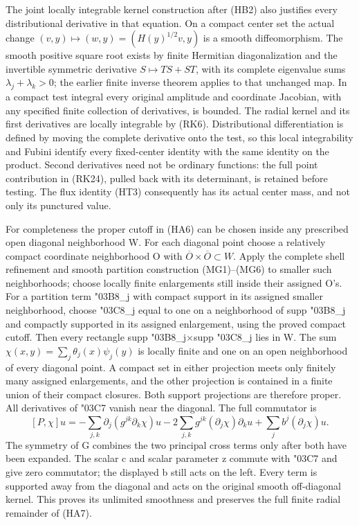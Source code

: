 \documentclass[
  11pt,
]{article}
\begin{document}
The joint locally integrable kernel construction after (HB2) also
justifies every distributional derivative in that equation. On a compact
center set the actual change \((v,y)\mapsto(w,y)=(H(y)^{1/2}v,y)\) is a
smooth diffeomorphism. The smooth positive square root exists by finite
Hermitian diagonalization and the invertible symmetric derivative
\(S\mapsto TS+ST\), with its complete eigenvalue sums
\(\lambda_j+\lambda_k>0\); the earlier finite inverse theorem applies to
that unchanged map. In a compact test integral every original amplitude
and coordinate Jacobian, with any specified finite collection of
derivatives, is bounded. The radial kernel and its first derivatives are
locally integrable by (RK6). Distributional differentiation is defined
by moving the complete derivative onto the test, so this local
integrability and Fubini identify every fixed-center identity with the
same identity on the product. Second derivatives need not be ordinary
functions: the full point contribution in (RK24), pulled back with its
determinant, is retained before testing. The flux identity (HT3)
consequently has its actual center mass, and not only its punctured
value.

For completeness the proper cutoff in (HA6) can be chosen inside any
prescribed open diagonal neighborhood W. For each diagonal point choose
a relatively compact coordinate neighborhood O with
\(\overline O\times\overline O\subset W\). Apply the complete shell
refinement and smooth partition construction (MG1)--(MG6) to smaller
such neighborhoods; choose locally finite enlargements still inside
their assigned O's. For a partition term {\ReaderSymbols\char"03B8}\_j with compact support in
its assigned smaller neighborhood, choose {\ReaderSymbols\char"03C8}\_j equal to one on a
neighborhood of supp {\ReaderSymbols\char"03B8}\_j and compactly supported in its assigned
enlargement, using the proved compact cutoff. Then every rectangle supp
{\ReaderSymbols\char"03B8}\_j×supp {\ReaderSymbols\char"03C8}\_j lies in W. The sum
\(\chi(x,y)=\sum_j\theta_j(x)\psi_j(y)\) is locally finite and one on an
open neighborhood of every diagonal point. A compact set in either
projection meets only finitely many assigned enlargements, and the other
projection is contained in a finite union of their compact closures.
Both support projections are therefore proper. All derivatives of {\ReaderSymbols\char"03C7}
vanish near the diagonal. The full commutator is \[
[P,\chi]u
=-\sum_{j,k}\partial_j(g^{jk}\partial_k\chi)u
 -2\sum_{j,k}g^{jk}(\partial_j\chi)\partial_ku
 +\sum_jb^j(\partial_j\chi)u.
\tag{HD3}
\] The symmetry of G combines the two principal cross terms only after
both have been expanded. The scalar c and scalar parameter z commute
with {\ReaderSymbols\char"03C7} and give zero commutator; the displayed b still acts on the left.
Every term is supported away from the diagonal and acts on the original
smooth off-diagonal kernel. This proves its unlimited smoothness and
preserves the full finite radial remainder of (HA7).
\end{document}
